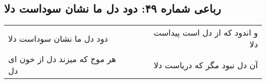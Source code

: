 \begin{center}
\section*{رباعی شماره ۴۹: دود دل ما نشان سوداست دلا}
\label{sec:0049}
\begin{longtable}{l p{0.5cm} r}
دود دل ما نشان سوداست دلا
&&
و اندود که از دل است پیداست دلا
\\
هر موج که میزند دل از خون ای دل
&&
آن دل نبود مگر که دریاست دلا
\\
\end{longtable}
\end{center}
